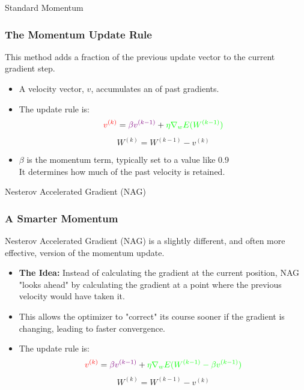 \begin{frame}{Standard Momentum}
    \frametitle{The Momentum Update Rule}
    This method adds a fraction of the previous update vector to the current gradient step.
    \begin{itemize}
        \item A velocity vector, $v$, accumulates an  of past gradients.
        \item The update rule is:
            $$ \textcolor{red}{v^{(k)}} = \textcolor{violet}{\beta v^{(k-1)}} + \textcolor{green}{\eta \nabla_w E(W^{(k-1)})} $$
            $$ W^{(k)} = W^{(k-1)} - v^{(k)} $$
        \item $\beta$ is the momentum term, typically set to a value like 0.9 \\ It determines how much of the past velocity is retained.
    \end{itemize}
\end{frame}

\begin{frame}{Nesterov Accelerated Gradient (NAG)}
    \frametitle{A Smarter Momentum}
    Nesterov Accelerated Gradient (NAG) is a slightly different, and often more effective, version of the momentum update.
    \begin{itemize}
        \item \textbf{The Idea:} Instead of calculating the gradient at the current position, NAG "looks ahead" by calculating the gradient at a point where the previous velocity would have taken it.
        \item This allows the optimizer to "correct" its course sooner if the gradient is changing, leading to faster convergence.
        \item The update rule is:
             $$ \textcolor{red}{v^{(k)}} = \textcolor{violet}{\beta v^{(k-1)}} + \textcolor{green}{\eta \nabla_w E(W^{(k-1)} - \beta v^{(k-1)})} $$
             $$ W^{(k)} = W^{(k-1)} - v^{(k)} $$
    \end{itemize}
\end{frame}

